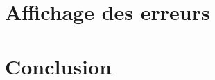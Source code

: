 \documentclass[french]{article}
\begin{document}
\section{Affichage des erreurs}

\section{Conclusion}
\end{document}
